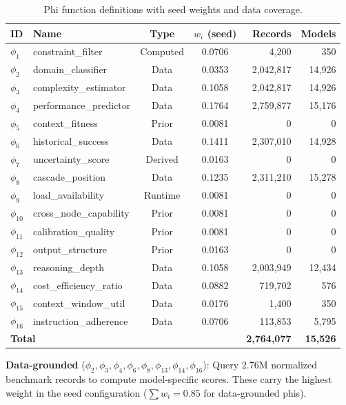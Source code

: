 \begin{table}[h]
\centering
\caption{Phi function definitions with seed weights and data coverage.}
\label{tab:phi_functions}
\small
\begin{tabular}{llccrr}
\toprule
\textbf{ID} & \textbf{Name} & \textbf{Type} & \textbf{$w_i$ (seed)} & \textbf{Records} & \textbf{Models} \\
\midrule
$\phi_1$ & constraint\_filter & Computed & 0.0706 & 4,200 & 350 \\
$\phi_2$ & domain\_classifier & Data & 0.0353 & 2,042,817 & 14,926 \\
$\phi_3$ & complexity\_estimator & Data & 0.1058 & 2,042,817 & 14,926 \\
$\phi_4$ & performance\_predictor & Data & 0.1764 & 2,759,877 & 15,176 \\
$\phi_5$ & context\_fitness & Prior & 0.0081 & 0 & 0 \\
$\phi_6$ & historical\_success & Data & 0.1411 & 2,307,010 & 14,928 \\
$\phi_7$ & uncertainty\_score & Derived & 0.0163 & 0 & 0 \\
$\phi_8$ & cascade\_position & Data & 0.1235 & 2,311,210 & 15,278 \\
$\phi_9$ & load\_availability & Runtime & 0.0081 & 0 & 0 \\
$\phi_{10}$ & cross\_node\_capability & Prior & 0.0081 & 0 & 0 \\
$\phi_{11}$ & calibration\_quality & Prior & 0.0081 & 0 & 0 \\
$\phi_{12}$ & output\_structure & Prior & 0.0163 & 0 & 0 \\
$\phi_{13}$ & reasoning\_depth & Data & 0.1058 & 2,003,949 & 12,434 \\
$\phi_{14}$ & cost\_efficiency\_ratio & Data & 0.0882 & 719,702 & 576 \\
$\phi_{15}$ & context\_window\_util & Data & 0.0176 & 1,400 & 350 \\
$\phi_{16}$ & instruction\_adherence & Data & 0.0706 & 113,853 & 5,795 \\
\midrule
\multicolumn{4}{l}{\textbf{Total}} & \textbf{2,764,077} & \textbf{15,526} \\
\bottomrule
\end{tabular}
\end{table}

\textbf{Data-grounded} ($\phi_2, \phi_3, \phi_4, \phi_6, \phi_8, \phi_{13}, \phi_{14}, \phi_{16}$): Query 2.76M normalized benchmark records to compute model-specific scores. These carry the highest weight in the seed configuration ($\sum w_i = 0.85$ for data-grounded phis).


